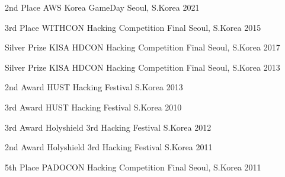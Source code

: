 

\begin{cvhonors}

  \cvhonor
    {2nd Place} %
    {AWS Korea GameDay} %
    {Seoul, S.Korea} %
    {2021} %

  \cvhonor
    {3rd Place} %
    {WITHCON Hacking Competition Final} %
    {Seoul, S.Korea} %
    {2015} %

  \cvhonor
    {Silver Prize} %
    {KISA HDCON Hacking Competition Final} %
    {Seoul, S.Korea} %
    {2017} %

  \cvhonor
    {Silver Prize} %
    {KISA HDCON Hacking Competition Final} %
    {Seoul, S.Korea} %
    {2013} %

  \cvhonor
    {2nd Award} %
    {HUST Hacking Festival} %
    {S.Korea} %
    {2013} %

  \cvhonor
    {3rd Award} %
    {HUST Hacking Festival} %
    {S.Korea} %
    {2010} %

  \cvhonor
    {3rd Award} %
    {Holyshield 3rd Hacking Festival} %
    {S.Korea} %
    {2012} %

  \cvhonor
    {2nd Award} %
    {Holyshield 3rd Hacking Festival} %
    {S.Korea} %
    {2011} %

  \cvhonor
    {5th Place} %
    {PADOCON Hacking Competition Final} %
    {Seoul, S.Korea} %
    {2011} %

\end{cvhonors}

